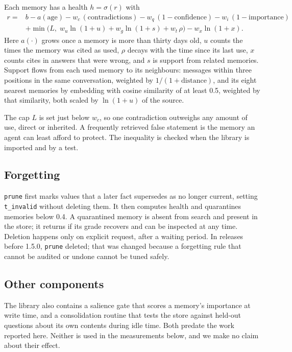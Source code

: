 \documentclass[11pt]{article}
\begin{document}
Each memory has a health $h=\sigma(r)$ with
\begin{align*}
r ={}& b - a(\text{age})
       - w_c\,(\text{contradictions})
       - w_q\,(1-\text{confidence})
       - w_i\,(1-\text{importance}) \\
     &+ \min\bigl(L,\;
        w_u \ln(1+u) + w_g \ln(1+s) + w_t\,\rho\bigr)
       - w_x \ln(1+x).
\end{align*}
Here $a(\cdot)$ grows once a memory is more than thirty days old, $u$
counts the times the memory was cited as used, $\rho$ decays with the
time since its last use, $x$ counts cites in answers that were wrong,
and $s$ is support from related memories. Support flows from each used
memory to its neighbours: messages within three positions in the same
conversation, weighted by $1/(1+\text{distance})$, and its eight
nearest memories by embedding with cosine similarity of at least 0.5,
weighted by that similarity, both scaled by $\ln(1+u)$ of the source.

The cap $L$ is set just below $w_c$, so one contradiction outweighs
any amount of use, direct or inherited. A frequently retrieved false
statement is the memory an agent can least afford to protect. The
inequality is checked when the library is imported and by a test.

\subsection{Forgetting}

\texttt{prune} first marks values that a later fact supersedes as no
longer current, setting \texttt{t\_invalid} without deleting them. It
then computes health and quarantines memories below 0.4. A quarantined
memory is absent from search and present in the store; it returns if
its grade recovers and can be inspected at any time. Deletion happens
only on explicit request, after a waiting period. In releases before
1.5.0, \texttt{prune} deleted; that was changed because a forgetting
rule that cannot be audited or undone cannot be tuned safely.

\subsection{Other components}

The library also contains a salience gate that scores a memory's
importance at write time, and a consolidation routine that tests the
store against held-out questions about its own contents during idle
time. Both predate the work reported here. Neither is used in the
measurements below, and we make no claim about their effect.
\end{document}

